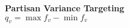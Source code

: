 \documentclass{article}
\begin{document}
\begin{center}
\textbf{ Partisan Variance Targeting } \\
$ q_v = \max{f_{v}} - \min{f_{v}} $
\end{center}
\end{document}
